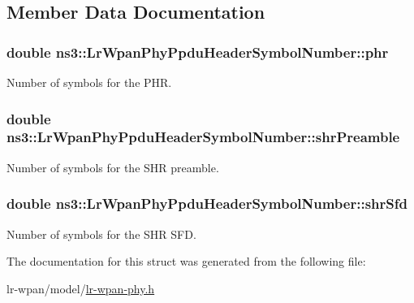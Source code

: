\subsection{Member Data Documentation}
\subsubsection[{\texorpdfstring{phr}{phr}}]{\setlength{\rightskip}{0pt plus 5cm}double ns3\+::\+Lr\+Wpan\+Phy\+Ppdu\+Header\+Symbol\+Number\+::phr}\hypertarget{structns3_1_1LrWpanPhyPpduHeaderSymbolNumber_a271039a734fb640a5b80e5fa52d77a96}{}\label{structns3_1_1LrWpanPhyPpduHeaderSymbolNumber_a271039a734fb640a5b80e5fa52d77a96}


Number of symbols for the P\+HR. 

\subsubsection[{\texorpdfstring{shr\+Preamble}{shrPreamble}}]{\setlength{\rightskip}{0pt plus 5cm}double ns3\+::\+Lr\+Wpan\+Phy\+Ppdu\+Header\+Symbol\+Number\+::shr\+Preamble}\hypertarget{structns3_1_1LrWpanPhyPpduHeaderSymbolNumber_a670cc0687ee040a2671cd91e2f410332}{}\label{structns3_1_1LrWpanPhyPpduHeaderSymbolNumber_a670cc0687ee040a2671cd91e2f410332}


Number of symbols for the S\+HR preamble. 

\subsubsection[{\texorpdfstring{shr\+Sfd}{shrSfd}}]{\setlength{\rightskip}{0pt plus 5cm}double ns3\+::\+Lr\+Wpan\+Phy\+Ppdu\+Header\+Symbol\+Number\+::shr\+Sfd}\hypertarget{structns3_1_1LrWpanPhyPpduHeaderSymbolNumber_a253fa19060c1826012ec685cec394025}{}\label{structns3_1_1LrWpanPhyPpduHeaderSymbolNumber_a253fa19060c1826012ec685cec394025}


Number of symbols for the S\+HR S\+FD. 



The documentation for this struct was generated from the following file\+:\begin{DoxyCompactItemize}
\item 
lr-\/wpan/model/\hyperlink{lr-wpan-phy_8h}{lr-\/wpan-\/phy.\+h}\end{DoxyCompactItemize}
